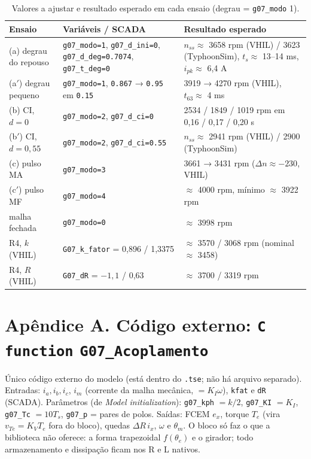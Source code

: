\documentclass[10pt,a4paper]{article}
\begin{document}
\begin{table}[!htbp]\centering\footnotesize
\caption{Valores a ajustar e resultado esperado em cada ensaio (degrau = \texttt{g07\_modo} 1).}\label{tab:roteiro}
\begin{tabularx}{\textwidth}{p{2.6cm}Yp{5.6cm}}\toprule
Ensaio & Variáveis / SCADA & Resultado esperado\\\midrule
(a) degrau do repouso & \texttt{g07\_modo=1}, \texttt{g07\_d\_ini=0}, \texttt{g07\_d\_deg=0.7074}, \texttt{g07\_t\_deg=0} & $n_{ss}\approx$ 3658 rpm (VHIL) / 3623 (TyphoonSim), $t_s\approx$ 13--14 ms, $i_{pk}\approx$ 6,4 A\\
(a$'$) degrau pequeno & \texttt{g07\_modo=1}, \texttt{0.867} → \texttt{0.95} em \texttt{0.15} & 3919 → 4270 rpm (VHIL), $t_{63}\approx$ 4 ms\\
(b) CI, $d=0$ & \texttt{g07\_modo=2}, \texttt{g07\_d\_ci=0} & 2534 / 1849 / 1019 rpm em 0,16 / 0,17 / 0,20 s\\
(b$'$) CI, $d=0{,}55$ & \texttt{g07\_modo=2}, \texttt{g07\_d\_ci=0.55} & $n_{ss}\approx$ 2941 rpm (VHIL) / 2900 (TyphoonSim)\\
(c) pulso MA & \texttt{g07\_modo=3} & 3661 → 3431 rpm ($\Delta n\approx-230$, VHIL)\\
(c$'$) pulso MF & \texttt{g07\_modo=4} & $\approx$ 4000 rpm, mínimo $\approx$ 3922 rpm\\
malha fechada & \texttt{g07\_modo=0} & $\approx$ 3998 rpm\\
R4, $k$ (VHIL) & \texttt{G07\_k\_fator} = 0,896 / 1,3375 & $\approx$ 3570 / 3068 rpm (nominal $\approx$ 3458)\\
R4, $R$ (VHIL) & \texttt{G07\_dR} = $-1{,}1$ / 0,63 & $\approx$ 3700 / 3319 rpm\\\bottomrule
\end{tabularx}
\end{table}

\FloatBarrier

\section*{Apêndice A. Código externo: \texttt{C function} \texttt{G07\_Acoplamento}}
Único código externo do modelo (está dentro do \texttt{.tse}; não há arquivo separado). Entradas: $i_a,i_b,i_c$, $i_m$ (corrente da malha mecânica, $=K_I\omega$), \texttt{kfat} e \texttt{dR} (SCADA). Parâmetros (de \emph{Model initialization}): \texttt{g07\_kph} $=k/2$, \texttt{g07\_KI} $=K_I$, \texttt{g07\_Tc} $=10T_s$, \texttt{g07\_p} = pares de polos. Saídas: FCEM $e_x$, torque $T_e$ (vira $v_{Te}=K_VT_e$ fora do bloco), quedas $\Delta R\,i_x$, $\omega$ e $\theta_m$. O bloco só faz o que a biblioteca não oferece: a forma trapezoidal $f(\theta_e)$ e o girador; todo armazenamento e dissipação ficam nos R e L nativos.
{\scriptsize{}}
\end{document}
